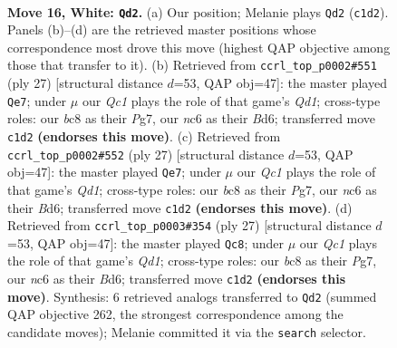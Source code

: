 \documentclass[11pt]{article}
\begin{document}
\clearpage

\begin{figure}[p]\centering
\begin{subfigure}{0.46\textwidth}\centering
\resizebox{\linewidth}{!}{%
\newchessgame
\chessboard[
  setfen={r1b1r1k1/1p2qppp/p1n1p3/2Pp4/3P4/P1P2N1P/4BPP1/R1Q2RK1 w - - 1 16},
  showmover=false,
  pgfstyle=straightmove, color=movearrow, markmove={c1-d2}
]}
\caption{}
\end{subfigure}\hfill
\begin{subfigure}{0.46\textwidth}\centering
\resizebox{\linewidth}{!}{%
\newchessgame
\chessboard[
  setfen={r2q1rk1/p1p2pp1/1p1bpn1p/8/3P4/P1Q3P1/1P2PPNP/R1BR2K1 b - - 0 14},
  showmover=false,
  pgfstyle=straightmove, color=movearrow, markmove={d8-e7}
]}
\caption{}
\end{subfigure}
\\[4pt]
\begin{subfigure}{0.46\textwidth}\centering
\resizebox{\linewidth}{!}{%
\newchessgame
\chessboard[
  setfen={r2q1rk1/p1p2pp1/1p1bpn1p/8/3P4/P1Q3P1/1P2PPNP/R1BR2K1 b - - 0 14},
  showmover=false,
  pgfstyle=straightmove, color=movearrow, markmove={d8-e7}
]}
\caption{}
\end{subfigure}\hfill
\begin{subfigure}{0.46\textwidth}\centering
\resizebox{\linewidth}{!}{%
\newchessgame
\chessboard[
  setfen={r2q1rk1/p1p2pp1/1p1bpn1p/8/3P4/P1Q3P1/1P2PPNP/R1BR2K1 b - - 0 14},
  showmover=false,
  pgfstyle=straightmove, color=movearrow, markmove={d8-c8}
]}
\caption{}
\end{subfigure}
\caption{\textbf{Move 16, White: \texttt{Qd2}.} (a) Our position; Melanie plays \texttt{Qd2} (\texttt{c1d2}). Panels (b)--(d) are the retrieved master positions whose correspondence most drove this move (highest QAP objective among those that transfer to it). (b) Retrieved from \texttt{ccrl\_top\_p0002\#551} (ply 27) [structural distance $d$=53, QAP obj=47]: the master played \texttt{Qe7}; under $\mu$ our \emph{Qc1} plays the role of that game's \emph{Qd1}; cross-type roles: our \emph{b}c8 as their \emph{P}g7, our \emph{n}c6 as their \emph{B}d6; transferred move \texttt{c1d2} \textbf{(endorses this move)}. (c) Retrieved from \texttt{ccrl\_top\_p0002\#552} (ply 27) [structural distance $d$=53, QAP obj=47]: the master played \texttt{Qe7}; under $\mu$ our \emph{Qc1} plays the role of that game's \emph{Qd1}; cross-type roles: our \emph{b}c8 as their \emph{P}g7, our \emph{n}c6 as their \emph{B}d6; transferred move \texttt{c1d2} \textbf{(endorses this move)}. (d) Retrieved from \texttt{ccrl\_top\_p0003\#354} (ply 27) [structural distance $d$=53, QAP obj=47]: the master played \texttt{Qc8}; under $\mu$ our \emph{Qc1} plays the role of that game's \emph{Qd1}; cross-type roles: our \emph{b}c8 as their \emph{P}g7, our \emph{n}c6 as their \emph{B}d6; transferred move \texttt{c1d2} \textbf{(endorses this move)}. Synthesis: 6 retrieved analogs transferred to \texttt{Qd2} (summed QAP objective 262, the strongest correspondence among the candidate moves); Melanie committed it via the \texttt{search} selector.}
\label{fig:thought-m30}
\end{figure}
\end{document}
